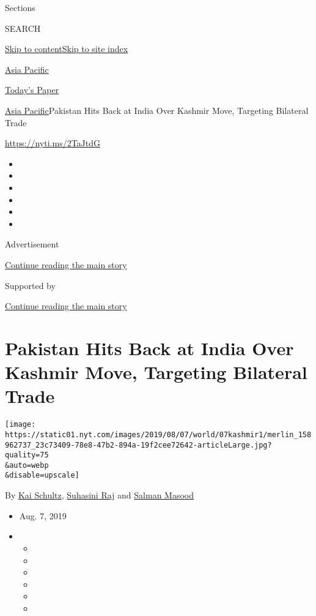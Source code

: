 Sections

SEARCH

\protect\hyperlink{site-content}{Skip to
content}\protect\hyperlink{site-index}{Skip to site index}

\href{https://www.nytimes.com/section/world/asia}{Asia Pacific}

\href{https://myaccount.nytimes.com/auth/login?response_type=cookie\&client_id=vi}{}

\href{https://www.nytimes.com/section/todayspaper}{Today's Paper}

\href{/section/world/asia}{Asia Pacific}\textbar{}Pakistan Hits Back at
India Over Kashmir Move, Targeting Bilateral Trade

\url{https://nyti.ms/2TaJtdG}

\begin{itemize}
\item
\item
\item
\item
\item
\item
\end{itemize}

Advertisement

\protect\hyperlink{after-top}{Continue reading the main story}

Supported by

\protect\hyperlink{after-sponsor}{Continue reading the main story}

\hypertarget{pakistan-hits-back-at-india-over-kashmir-move-targeting-bilateral-trade}{%
\section{Pakistan Hits Back at India Over Kashmir Move, Targeting
Bilateral
Trade}\label{pakistan-hits-back-at-india-over-kashmir-move-targeting-bilateral-trade}}

\texttt{[image: https://static01.nyt.com/images/2019/08/07/world/07kashmir1/merlin\_158962737\_23c73409-78e8-47b2-894a-19f2cee72642-articleLarge.jpg?quality=75\\\&auto=webp\\\&disable=upscale]}

By \href{https://www.nytimes.com/by/kai-schultz}{Kai Schultz},
\href{https://www.nytimes.com/by/suhasini-raj}{Suhasini Raj} and
\href{https://www.nytimes.com/by/salman-masood}{Salman Masood}

\begin{itemize}
\item
  Aug. 7, 2019
\item
  \begin{itemize}
  \item
  \item
  \item
  \item
  \item
  \item
  \end{itemize}
\end{itemize}

